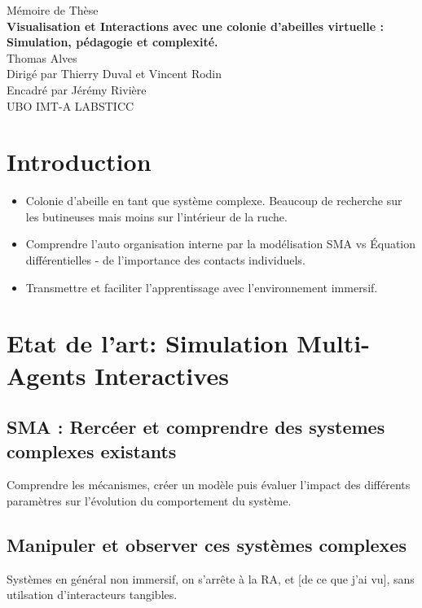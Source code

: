 \documentclass[10pt,a4paper]{article}
\begin{document}
	\begin{titlepage}
		\begin{center}
		\Large Mémoire de Thèse\\
		\vspace{4em}
		\LARGE\textbf{Visualisation et Interactions avec une colonie d'abeilles virtuelle :\\}
		\vspace{1em}
		\Large\textbf{Simulation, pédagogie et complexité.\\}		
		\vspace{8em}
		\LARGE Thomas Alves\\
		\vspace{8em}
		\Large Dirigé par Thierry Duval et Vincent Rodin\\
		Encadré par Jérémy Rivière\\
		\vspace{8em}
		\Large UBO IMT-A LABSTICC\\
		\end{center}	 
	\end{titlepage}
	
\tableofcontents
	
\section{Introduction}
\begin{itemize}
	\item Colonie d'abeille en tant que système complexe. Beaucoup de recherche sur les butineuses mais moins sur l'intérieur de la ruche.	
	\item Comprendre l'auto organisation interne par la modélisation SMA vs Équation différentielles - de l'importance des contacts individuels.	
	\item Transmettre et faciliter l'apprentissage avec l'environnement immersif.
\end{itemize}
\section{Etat de l'art: Simulation Multi-Agents Interactives}
	\subsection{SMA : Rercéer et comprendre des systemes complexes existants}
		Comprendre les mécanismes, créer un modèle puis évaluer l'impact des différents paramètres sur l'évolution du comportement du système.
	\subsection{Manipuler et observer ces systèmes complexes}
		Systèmes en général non immersif, on s'arrête à la RA, et [de ce que j'ai vu], sans utilsation d'interacteurs tangibles.
\end{document}
